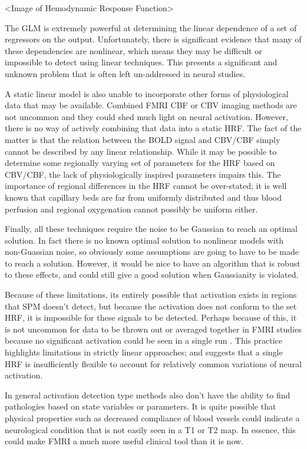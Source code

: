 \documentclass{article}
\begin{document}
<Image of Hemodynamic Response Function>

The GLM is extremely powerful at determining the linear dependence of
a set of regressors on the output. Unfortunately, there is significant evidence
that many of these dependencies are nonlinear, which means they may be
difficult or impossible to detect using linear techniques. This presents
a significant and unknown problem that is often left un-addressed in 
neural studies.

A static linear model is also unable to incorporate other forms of physiological
data that may be available. Combined FMRI
CBF or CBV imaging methods are not uncommon and they could shed much light on
neural activation. However, there is no way of actively combining that data 
into a static HRF. The fact of the matter is that the relation between the 
BOLD signal and CBV/CBF simply cannot be described by any linear relationship.
While it may be possible to determine some regionally varying set of parameters
for the HRF based on CBV/CBF, the lack of physiologically inspired parameters
impairs this. The importance of regional differences in the HRF cannot be
over-stated; it is well known that capillary beds are far from uniformly distributed
and thus blood perfusion and regional oxygenation cannot possibly be uniform
either. 

Finally, all these techniques require the noise to be Gaussian to reach
an optimal solution. In fact there is no known optimal solution to
nonlinear models with non-Guassian noise, so obviously some assumptions
are going to have to be made to reach a solution. However, it would be
nice to have an algorithm that is robust to these effects, and could
still give a good solution when Gaussianity is violated.

Because of these limitations, its entirely possible that activation exists
in regions that SPM doesn't detect, but because the activation does not conform
to the set HRF, it is impossible for these signals to be detected. Perhaps
because of this, it is not uncommon for data to be thrown out or averaged
together in FMRI studies because 
no significant activation could be seen in a single run \cite{Riera2004}
\cite{Johnston2008}. This practice highlights 
limitations in strictly linear approaches; and suggests that a single HRF is 
insufficiently flexible to account for relatively common variations of neural activation. 

In general activation detection type methods also don't have the ability 
to find pathologies based on state variables or parameters.  It
is quite possible that physical properties such as decreased compliance of
blood vessels could indicate a neurological condition that is not easily
seen in a T1 or T2 map. In essence, this could make FMRI a much more 
useful clinical tool than it is now. 
\end{document}
